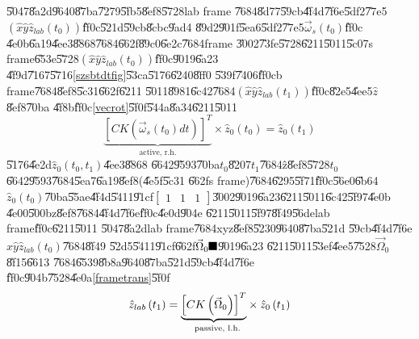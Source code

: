 \documentclass[12pt]{article}
\begin{document}
\U{5047}\U{8a2d}\U{9640}\U{87ba}\U{7279}\U{5fb5}\U{8ef8}\U{5728}lab frame%
\U{7684}\U{8d77}\U{59cb}\U{4f4d}\U{7f6e}\U{5df2}\U{77e5}$\left( \hat{x}\hat{y%
}\hat{z}_{lab}(t_{0})\right) $\U{ff0c}\U{521d}\U{59cb}\U{8cbc}\U{9ad4}%
\U{89d2}\U{901f}\U{5ea6}\U{5df2}\U{77e5}$\vec{\omega}_{s}(t_{0})$\U{ff0c}%
\U{4e0b}\U{6a19}\U{4ee3}\U{8868}\U{7684}\U{662f}\U{89c0}\U{6e2c}\U{7684}frame%
\U{3002}\U{73fe}\U{5728}\U{6211}\U{5011}\U{5c07}s frame\U{653e}\U{5728}$%
\left( \hat{x}\hat{y}\hat{z}_{lab}(t_{0})\right) $\U{ff0c}\U{9019}\U{6a23}%
\U{4f9d}\U{7167}\U{5716}\ref{szsbtdtfig}\U{53ca}\U{5176}\U{6240}\U{8ff0}%
\U{539f}\U{7406}\U{ff0c}b frame\U{7684}\U{8ef8}\U{5c31}\U{662f}\U{6211}%
\U{5011}\U{8981}\U{6c42}\U{7684}$\left( \hat{x}\hat{y}\hat{z}%
_{lab}(t_{1})\right) $\U{ff0c}\U{82e5}\U{4ee5}$\hat{z}$\U{8ef8}\U{70ba}%
\U{4f8b}\U{ff0c}\ref{vecrot}\U{5f0f}\U{544a}\U{8a34}\U{6211}\U{5011}%
\begin{equation*}
\underset{\text{active, r.h.}}{\underbrace{\left[ CK\left( \vec{\omega}%
_{s}\left( t_{0}\right) dt\right) \right] ^{T}}}\times \hat{z}_{0}\left(
t_{0}\right) =\hat{z}_{0}\left( t_{1}\right)
\end{equation*}%
\U{5176}\U{4e2d}$\hat{z}_{0}\left( t_{0},t_{1}\right) $\U{4ee3}\U{8868}%
\U{6642}\U{9593}\U{70ba}$t_{0}$\U{8207}$t_{1}$\U{7684}\^{z}\U{8ef8}\U{5728}$%
t_{0}$\U{6642}\U{9593}\U{7684}\U{5ea7}\U{6a19}\U{8ef8}(\U{4e5f}\U{5c31}%
\U{662f}s frame)\U{7684}\U{6295}\U{5f71}\U{ff0c}\U{56e0}\U{6b64}$\hat{z}%
_{0}\left( t_{0}\right) $\U{70ba}\U{55ae}\U{4f4d}\U{5411}\U{91cf}$\left[ 
\begin{array}{ccc}
1 & 1 & 1%
\end{array}%
\right] $\U{3002}\U{9019}\U{6a23}\U{6211}\U{5011}\U{6c42}\U{5f97}\U{4e0b}%
\U{4e00}\U{500b}z\U{8ef8}\U{7684}\U{4f4d}\U{7f6e}\U{ff0c}\U{4e0d}\U{904e}%
\U{6211}\U{5011}\U{5f97}\U{8f49}\U{56de}lab frame\U{ff0c}\U{6211}\U{5011}%
\U{5047}\U{8a2d}lab frame\U{7684}xyz\U{8ef8}\U{5230}\U{9640}\U{87ba}\U{521d}%
\U{59cb}\U{4f4d}\U{7f6e}$\hat{x}\hat{y}\hat{z}_{lab}(t_{0})$\U{7684}\U{8f49}%
\U{52d5}\U{5411}\U{91cf}\U{662f}$\vec{\Omega}_{0}\U{ff0c} $\U{9019}\U{6a23}%
\U{6211}\U{5011}\U{53ef}\U{4ee5}\U{7528}$\vec{\Omega}_{0}$\U{8f15}\U{6613}%
\U{7684}\U{6539}\U{8b8a}\U{9640}\U{87ba}\U{521d}\U{59cb}\U{4f4d}\U{7f6e}%
\U{ff0c}\U{904b}\U{7528}\U{4e0a}\ref{frametrans}\U{5f0f}%
\begin{equation*}
\hat{z}_{lab}\left( t_{1}\right) =\underset{\text{passive, l.h.}}{%
\underbrace{\left[ CK\left( \vec{\Omega}_{0}\right) \right] ^{T}}}\times 
\hat{z}_{0}\left( t_{1}\right)
\end{equation*}%
\end{document}
